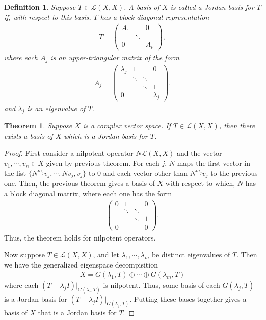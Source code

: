 \documentclass[11pt]{book}
\newtheorem{definition}{Definition}[section]
\newtheorem{theorem}{Theorem}[section]
\theoremstyle{definition}
\numberwithin{equation}{subsection}
\begin{document}
\medskip

\begin{definition}
Suppose $T\in\mathcal{L}(X,X)$. A basis of $X$ is called a Jordan basis for $T$ if, with respect to this basis, $T$ has a block diagonal representation
\begin{align*}
    T = \begin{pmatrix}
    A_1 &  & 0 \\
     & \ddots &  \\
    0 &  & A_p 
    \end{pmatrix},
\end{align*}
where each $A_j$ is an upper-triangular matrix of the form
\begin{align*}
    A_j = \begin{pmatrix}
    \lambda_j & 1 & & 0 \\
     & \ddots &  \ddots & \\
     &  & \ddots & 1 \\
    0 & & & \lambda_j
    \end{pmatrix}.
\end{align*}
and $\lambda_j$ is an eigenvalue of $T$.
\end{definition}

\medskip

\begin{theorem}
Suppose $X$ is a complex vector space. If $T\in\mathcal{L}(X,X)$, then there exists a basis of $X$ which is a Jordan basis for $T$.
\end{theorem}
\begin{proof}
First consider a nilpotent operator $N\mathcal{L}(X,X)$ and the vector $v_1,\cdots,v_n \in X$ given by previous theorem. For each $j$, $N$ maps the first vector in the list $\{N^{m_j}v_j, \cdots, Nv_j,v_j\}$ to $0$ and each vector other than $N^{m_j}v_j$ to the previous one. Then, the previous theorem gives a basis of $X$ with respect to which, $N$ has a block diagonal matrix, where each one has the form 
\begin{align*}
    \begin{pmatrix}
    0 & 1 & & 0 \\
     & \ddots &  \ddots & \\
     &  & \ddots & 1 \\
    0 & & & 0
    \end{pmatrix}.
\end{align*}
Thus, the theorem holds for nilpotent operators. 

Now suppose $T\in\mathcal{L}(X,X)$, and let $\lambda_1,\cdots,\lambda_m$ be distinct eigenvalues of $T$. Then we have the generalized eigenspace decompisition
\begin{align*}
    X = G(\lambda_1, T)\oplus \cdots \oplus G(\lambda_m, T)
\end{align*}
where each $(T-\lambda_j I)|_{G(\lambda_j, T)}$ is nilpotent. Thus, some basis of each $G(\lambda_j,T)$ is a Jordan basis for $(T-\lambda_j I)|_{G(\lambda_j, T)}$. Putting these bases together gives a basis of $X$ that is a Jordan basis for $T$.
\end{proof}
\end{document}
